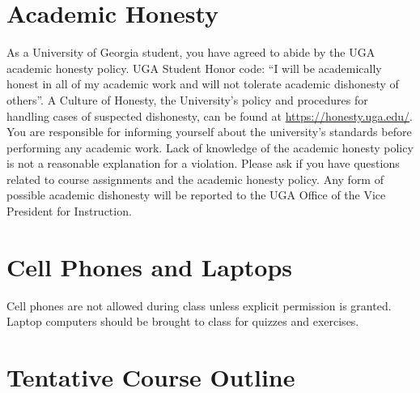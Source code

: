 \documentclass[12pt]{article}
\begin{document}
\section*{\normalsize Academic Honesty}
\vspace{-4mm}
As a University of Georgia student, you have agreed to abide by the
UGA academic honesty policy. UGA Student Honor code: “I will be
academically honest in all of my academic work and will not tolerate
academic dishonesty of others”. A Culture of Honesty, the University's
policy and procedures for handling cases of suspected dishonesty, can
be found at \url{https://honesty.uga.edu/}. You are responsible for
informing yourself about the university’s standards before performing
any academic work. Lack of knowledge of the academic honesty policy is
not a reasonable explanation for a violation. Please ask if you have
questions related to course assignments and the academic honesty
policy. Any form of possible academic dishonesty will be reported to
the UGA Office of the Vice President for Instruction.

\vspace{-2mm}
\section*{\normalsize Cell Phones and Laptops}
\vspace{-4mm}
Cell phones are not allowed during class unless explicit permission is
granted. Laptop computers should be brought to class for quizzes and
exercises.



\section*{\normalsize Tentative Course Outline}
\end{document}
